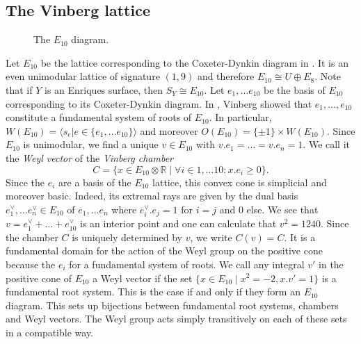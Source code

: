 \documentclass{amsart}
\theoremstyle{definition}
\theoremstyle{plain}
\newcommand{\RR}{\mathbb{R}}
\begin{document}
\subsection{The Vinberg lattice}\label{sec:vinberg}
\begin{figure}
\caption{The $E_{10}$ diagram.}\label{figure:E10}
\end{figure}
Let $E_{10}$ be the lattice corresponding to the Coxeter-Dynkin diagram in .
It is an even unimodular lattice of signature $(1,9)$ and therefore $E_{10}\cong U \oplus E_8$.
Note that if $Y$ is an Enriques surface, then $S_Y\cong E_{10}$.
Let $e_{1}, \dots e_{10}$ be the basis of $E_{10}$ corresponding to its Coxeter-Dynkin diagram.
In \cite{vinberg}, Vinberg showed that $e_{1}, \dots , e_{10}$ constitute a fundamental system of roots of $E_{10}$. In particular,
$W(E_{10}) = \langle s_e | e \in \{e_1,\dots e_{10}\}\rangle$ and moreover $O(E_{10}) = \{\pm 1\} \times W(E_{10})$.
Since $E_{10}$ is unimodular, we find a unique $v \in E_{10}$ with $v.e_1=\dots=v.e_n = 1$. We call it the
\emph{Weyl vector} of the \emph{Vinberg chamber}
\[C = \{ x \in E_{10}\otimes \RR \mid \forall i \in {1,\dots 10}\colon x.e_i \geq 0\}.\]
Since the $e_i$ are a basis of the $E_{10}$ lattice, this convex cone is simplicial and moreover basic.
Indeed, its extremal rays are given by the dual basis $e_1^\vee, \dots e_n^\vee \in E_{10}$ of $e_1,\dots e_n$ where $e_i^\vee.e_j = 1$ for $i=j$ and $0$ else.
We see that $v = e_1^\vee + \dots + e_{10}^{\vee}$ is an interior point and one can calculate that $v^2= 1240$.
Since the chamber $C$ is uniquely determined by $v$, we write $C(v)=C$.  It is a fundamental domain for the action of the Weyl group on the positive cone because the $e_i$ for a fundamental system of roots. We call any integral $v'$ in the positive cone of \(E_{10}\) a Weyl vector if the set $\{x \in E_{10} \mid x^2 = -2, x.v'=1\}$ is a fundamental root system. This is the case if and only if they form an $E_{10}$ diagram.
This sets up bijections between fundamental root systems, chambers and Weyl vectors. The Weyl group acts simply transitively on each of these sets in a compatible way.
\end{document}

